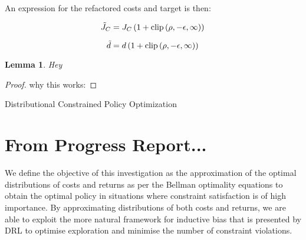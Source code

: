 \documentclass[12pt,twoside]{report}
\newtheorem{lemma}[theorem]{Lemma}
\begin{document}
\noindent An expression for the refactored costs and target is then: 

\begin{equation}
\tilde{J}_{C} = J_C \left( 1 + \textrm{clip} \left( \rho, -\epsilon, \infty \right) \right) \\
\end{equation}

\begin{equation}
\tilde{d} =  d  \left( 1 + \textrm{clip} \left( \rho, -\epsilon, \infty \right) \right) \\
\end{equation}

\begin{lemma}
Hey
\end{lemma}

\begin{proof}  
why this works:
\end{proof}

\begin{algorithm}[hbt!]
\caption{Distributional Constrained Policy Optimization}\label{alg:dcpo}
\end{algorithm}

\section{From Progress Report...}
We define the objective of this investigation as the approximation of the optimal distributions of costs and returns as per the Bellman optimality equations to obtain the optimal policy in situations where constraint satisfaction is of high importance. By approximating distributions of both costs and returns, we are able to exploit the more natural framework for inductive bias \cite{distributional-perspective} that is presented by DRL to optimise exploration and minimise the number of constraint violations. 
\end{document}
